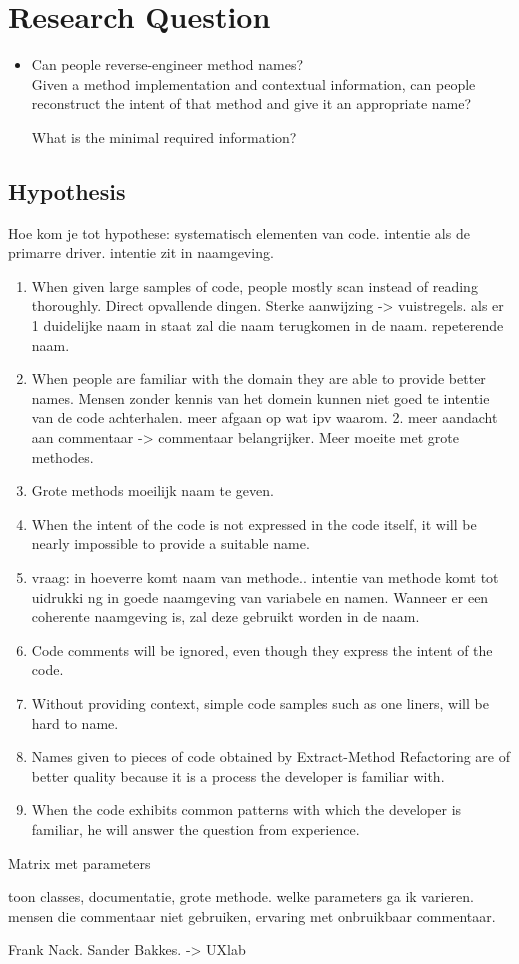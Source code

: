 \section{Research Question}

\begin{itemize}	
	\item Can people reverse-engineer method names?\\
	{\small Given a method implementation and contextual information, can people reconstruct the intent of that method and give it an appropriate name?}
	
		\subitem What is the minimal required information?
\end{itemize}

\subsection{Hypothesis}

Hoe kom je tot hypothese: systematisch elementen van code. intentie als de primarre driver. intentie zit in naamgeving.

\begin{enumerate}
\item When given large samples of code, people mostly scan instead of reading thoroughly. Direct opvallende dingen. Sterke aanwijzing -> vuistregels. als er 1 duidelijke naam in staat zal die naam terugkomen in de naam. repeterende naam.
\item When people are familiar with the domain they are able to provide better names.
Mensen zonder kennis van het domein kunnen niet goed te intentie van de code achterhalen.
meer afgaan op wat ipv waarom. 2. meer aandacht aan commentaar -> commentaar belangrijker. Meer moeite met grote methodes.

\item Grote methods moeilijk naam te geven.


\item When the intent of the code is not expressed in the code itself, it will be nearly impossible to provide a suitable name.
\item vraag: in hoeverre komt naam van methode.. intentie van methode komt tot uidrukki ng in goede naamgeving van variabele en namen. Wanneer er een coherente naamgeving is, zal deze gebruikt worden in de naam.


\item Code comments will be ignored, even though they express the intent of the code.
\item Without providing context, simple code samples such as one liners, will be hard to name.
\item Names given to pieces of code obtained by Extract-Method Refactoring are of better quality because it is a process the developer is familiar with.
\item When the code exhibits common patterns with which the developer is familiar, he will answer the question from experience. 
\end{enumerate}


Matrix met parameters

toon classes, documentatie, grote methode. welke parameters ga ik varieren. mensen die commentaar niet gebruiken, ervaring met onbruikbaar commentaar.

Frank Nack. Sander Bakkes. -> UXlab
